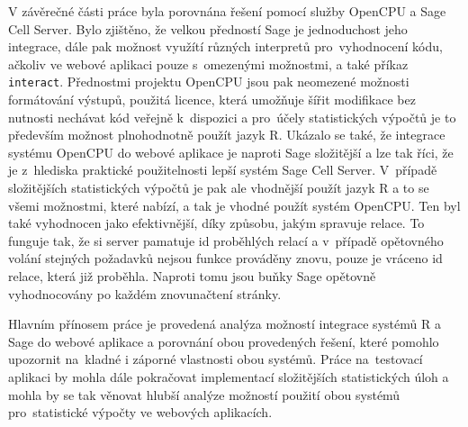 \documentclass[thesis=B,czech]{FITthesis}[2012/06/26]
\begin{document}
\begin{conclusion}
V závěrečné části práce byla porovnána řešení pomocí služby OpenCPU a Sage Cell Server. Bylo zjištěno, že velkou předností Sage je jednoduchost jeho integrace, dále pak možnost využítí různých interpretů pro~vyhodnocení kódu, ačkoliv ve webové aplikaci pouze s~omezenými možnostmi, a také příkaz \texttt{interact}. Přednostmi projektu OpenCPU jsou pak neomezené možnosti formátování výstupů, použitá licence, která umožňuje šířit modifikace bez nutnosti nechávat kód veřejně k~dispozici a pro~účely statistických výpočtů je to především možnost plnohodnotně použít jazyk R. Ukázalo se také, že integrace systému OpenCPU do webové aplikace je naproti Sage složitější a lze tak říci, že je z~hlediska praktické použitelnosti lepší systém Sage Cell Server. V~případě složitějších statistických výpočtů je pak ale vhodnější použít jazyk R a to se všemi možnostmi, které nabízí, a tak je vhodné použít systém OpenCPU. Ten byl také vyhodnocen jako efektivnější, díky způsobu, jakým spravuje relace. To funguje tak, že si server pamatuje id proběhlých relací a v~případě opětovného volání stejných požadavků nejsou funkce prováděny znovu, pouze je vráceno id relace, která již proběhla. Naproti tomu jsou buňky Sage opětovně vyhodnocovány po každém znovunačtení stránky. 

Hlavním přínosem práce je provedená analýza možností integrace systémů R a Sage do webové aplikace a porovnání obou provedených řešení, které pomohlo upozornit na~kladné i záporné vlastnosti obou systémů. Práce na~testovací aplikaci by mohla dále pokračovat implementací složitějších statistických úloh a mohla by se tak věnovat hlubší analýze možností použití obou systémů pro~statistické výpočty ve webových aplikacích. 
	
\end{conclusion}



\appendix
\end{document}
